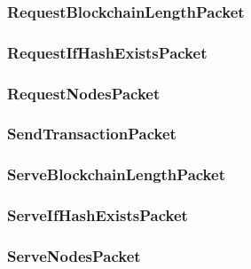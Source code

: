 \documentclass[../documentation.tex]{subfiles}
\begin{document}
\subsubsection{RequestBlockchainLengthPacket}


\subsubsection{RequestIfHashExistsPacket}


\subsubsection{RequestNodesPacket}


\subsubsection{SendTransactionPacket}


\subsubsection{ServeBlockchainLengthPacket}


\subsubsection{ServeIfHashExistsPacket}


\subsubsection{ServeNodesPacket}



\end{document}
